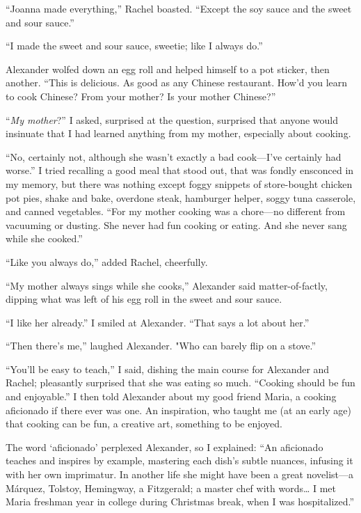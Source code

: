 ``Joanna made everything,'' Rachel boasted. ``Except the soy sauce and
the sweet and sour sauce.''

``I made the sweet and sour sauce, sweetie; like I always do.''

Alexander wolfed down an egg roll and helped himself to a pot sticker,
then another. ``This is delicious. As good as any Chinese restaurant.
How'd you learn to cook Chinese? From your mother? Is your mother
Chinese?''

``\emph{My mother}?'' I asked, surprised at the question, surprised that
anyone would insinuate that I had learned anything from my mother,
especially about cooking.

``No, certainly not, although she wasn't exactly a bad cook---I've
certainly had worse.'' I tried recalling a good meal that stood out,
that was fondly ensconced in my memory, but there was nothing except
foggy snippets of store-bought chicken pot pies, shake and bake,
overdone steak, hamburger helper, soggy tuna casserole, and canned
vegetables. ``For my mother cooking was a chore---no different from
vacuuming or dusting. She never had fun cooking or eating. And she never
sang while she cooked.''

``Like you always do,'' added Rachel, cheerfully.

``My mother always sings while she cooks,'' Alexander said
matter-of-factly, dipping what was left of his egg roll in the sweet and
sour sauce.

``I like her already.'' I smiled at Alexander. ``That says a lot about
her.''

``Then there's me,'' laughed Alexander. "Who can barely flip on a
stove.''

``You'll be easy to teach,'' I said, dishing the main course for
Alexander and Rachel; pleasantly surprised that she was eating so much.
``Cooking should be fun and enjoyable.'' I then told Alexander about my
good friend Maria, a cooking aficionado if there ever was one. An
inspiration, who taught me (at an early age) that cooking can be fun, a
creative art, something to be enjoyed.

The word `aficionado' perplexed Alexander, so I explained: ``An
aficionado teaches and inspires by example, mastering each dish's subtle
nuances, infusing it with her own imprimatur. In another life she might
have been a great novelist---a Márquez, Tolstoy, Hemingway, a
Fitzgerald; a master chef with words\ldots{} I met Maria freshman year
in college during Christmas break, when I was hospitalized.''

